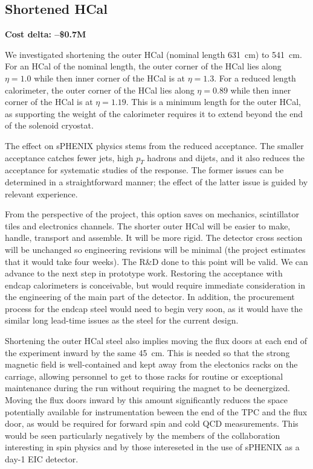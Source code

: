 \subsection{Shortened HCal}
\label{ohcal_short}

\textbf{Cost delta: --\$0.7M}
 
We investigated shortening the outer HCal (nominal length 631~cm) to
541~cm.  For an HCal of the nominal length, the outer corner of the
HCal lies along $\eta = 1.0$ while then inner corner of the HCal is at
$\eta = 1.3$.  For a reduced length calorimeter, the outer corner of
the HCal lies along $\eta = 0.89$ while then inner corner of the HCal
is at $\eta = 1.19$.  This is a minimum length for the outer HCal, as
supporting the weight of the calorimeter requires it to extend beyond
the end of the solenoid cryostat.

The effect on sPHENIX physics stems from the reduced acceptance.  The
smaller acceptance catches fewer jets, high $p_T$ hadrons and dijets,
and it also reduces the acceptance for systematic studies of the
response.  The former issues can be determined in a straightforward
manner; the effect of the latter issue is guided by relevant
experience.

From the perspective of the project, this option saves on mechanics,
scintillator tiles and electronics channels.  The shorter outer HCal
will be easier to make, handle, transport and assemble.  It will be
more rigid.  The detector cross section will be unchanged so
engineering revisions will be minimal (the project estimates that it
would take four weeks). The R\&D done to this point will be valid.  We
can advance to the next step in prototype work.  Restoring the
acceptance with endcap calorimeters is conceivable, but would require
immediate consideration in the engineering of the main part of the
detector.  In addition, the procurement process for the endcap steel
would need to begin very soon, as it would have the similar long
lead-time issues as the steel for the current design.

Shortening the outer HCal steel also implies moving the flux doors at
each end of the experiment inward by the same 45~cm.  This is needed
so that the strong magnetic field is well-contained and kept away from
the electonics racks on the carriage, allowing personnel to get to
those racks for routine or exceptional maintenance during the run
without requiring the magnet to be deenergized.  Moving the flux doors
inward by this amount significantly reduces the space potentially
available for instrumentation beween the end of the TPC and the flux
door, as would be required for forward spin and cold QCD measurements.
This would be seen particularly negatively by the members of the
collaboration interesting in spin physics and by those intereseted in
the use of sPHENIX as a day-1 EIC detector.
